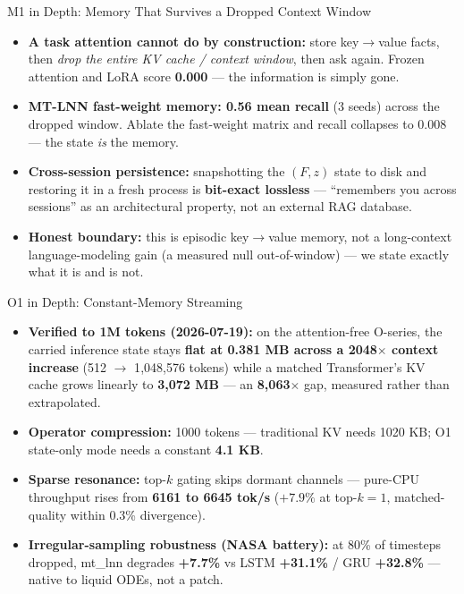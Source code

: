 \documentclass[aspectratio=169, 10pt]{beamer}
\begin{document}
\begin{frame}{M1 in Depth: Memory That Survives a Dropped Context Window}
\begin{itemize}
    \item \textbf{A task attention cannot do by construction:} store key$\to$value facts, then \emph{drop the entire KV cache / context window}, then ask again. Frozen attention and LoRA score \textbf{0.000} --- the information is simply gone.
    \item \textbf{MT-LNN fast-weight memory: 0.56 mean recall} (3 seeds) across the dropped window. Ablate the fast-weight matrix and recall collapses to 0.008 --- the state \emph{is} the memory.
    \item \textbf{Cross-session persistence:} snapshotting the $(F, z)$ state to disk and restoring it in a fresh process is \textbf{bit-exact lossless} --- ``remembers you across sessions'' as an architectural property, not an external RAG database.
    \item \textbf{Honest boundary:} this is episodic key$\to$value memory, not a long-context language-modeling gain (a measured null out-of-window) --- we state exactly what it is and is not.
\end{itemize}
\end{frame}

\begin{frame}{O1 in Depth: Constant-Memory Streaming}
\begin{itemize}
    \item \textbf{Verified to 1M tokens (2026-07-19):} on the attention-free O-series, the carried inference state stays \textbf{flat at 0.381 MB across a 2048$\times$ context increase} (512 $\to$ 1{,}048{,}576 tokens) while a matched Transformer's KV cache grows linearly to \textbf{3{,}072 MB} --- an \textbf{8{,}063$\times$} gap, measured rather than extrapolated.
    \item \textbf{Operator compression:} 1000 tokens --- traditional KV needs 1020 KB; O1 state-only mode needs a constant \textbf{4.1 KB}.
    \item \textbf{Sparse resonance:} top-$k$ gating skips dormant channels --- pure-CPU throughput rises from \textbf{6161 to 6645 tok/s} ($+7.9\%$ at top-$k{=}1$, matched-quality within 0.3\% divergence).
    \item \textbf{Irregular-sampling robustness (NASA battery):} at 80\% of timesteps dropped, mt\_lnn degrades \textbf{+7.7\%} vs LSTM \textbf{+31.1\%} / GRU \textbf{+32.8\%} --- native to liquid ODEs, not a patch.
\end{itemize}
\end{frame}
\end{document}
